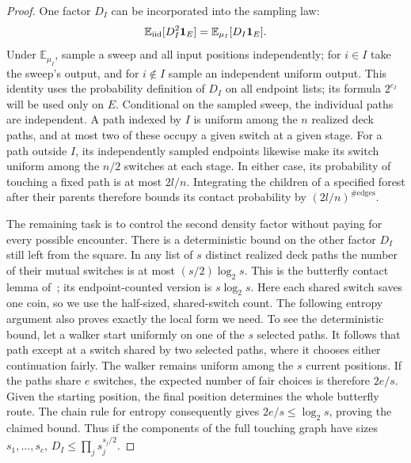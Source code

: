 \begin{proof}
One factor $D_I$ can be incorporated into the sampling law:
\[
 \mathbb E_{\rm iid}[D_I^2\mathbf1_E]
 =\mathbb E_{\mu_I}[D_I\mathbf1_E].
\]
Under $\mathbb E_{\mu_I}$, sample a sweep and all input positions independently;
for $i\in I$ take the sweep's output, and for $i\notin I$ sample an
independent uniform output. This identity uses the probability definition
of $D_I$ on all endpoint lists; its formula $2^{e_I}$ will be used only on
$E$. Conditional on the sampled sweep, the individual paths are
independent. A path indexed by $I$ is uniform among the $n$ realized deck
paths, and at most two of these occupy a given switch at a given stage.
For a path outside $I$, its independently sampled endpoints likewise make
its switch uniform among the $n/2$ switches at each stage. In either case,
its probability of touching a fixed path is at most $2l/n$. Integrating
the children of a specified forest after their parents therefore bounds
its contact probability by $(2l/n)^{\#\mathrm{edges}}$.

The remaining task is to control the second density factor without paying for every possible encounter. There is a deterministic bound on the other factor \(D_I\) still left from the square. In any list of \(s\) distinct realized deck paths the number of their mutual switches is at most \((s/2)\log_2 s\). This is the butterfly contact lemma of~\cite[Lemma~3.2]{OpenAIRouting2026}; its endpoint-counted version is $s\log_2s$. Here each shared switch saves one coin, so we use the half-sized, shared-switch count. The following entropy argument also proves exactly the local form we need. To see the deterministic bound, let a walker start uniformly on one of
the $s$ selected paths. It follows that path except at a switch shared by
two selected paths, where it chooses either continuation fairly. The
walker remains uniform among the $s$ current positions. If the paths
share $e$ switches, the expected number of fair choices is therefore
$2e/s$. Given the starting position, the final position determines the
whole butterfly route. The chain rule for entropy consequently gives
$2e/s\le\log_2 s$, proving the claimed bound. Thus if the components of the full touching graph have sizes \(s_1,\ldots,s_c\), \(D_I\le\prod_j s_j^{s_j/2}\).


\end{proof}
